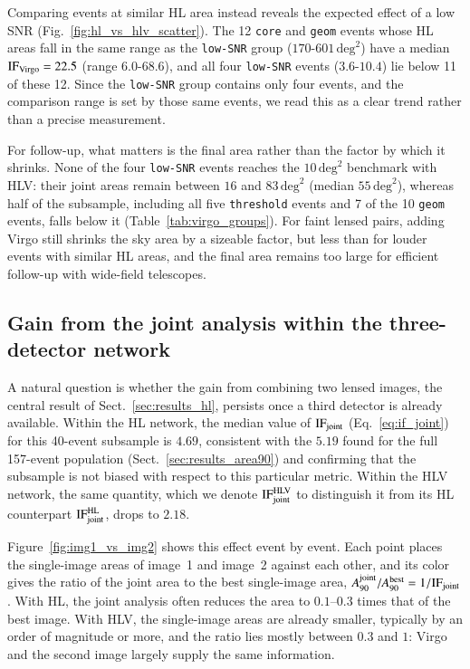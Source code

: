 \documentclass{aa}
\begin{document}
Comparing events at similar HL area instead reveals the expected effect of
a low SNR (Fig.~\ref{fig:hl_vs_hlv_scatter}). The 12 \texttt{core} and
\texttt{geom} events whose HL areas fall in the same range as the
\texttt{low-SNR} group ($170$-$601\,\mathrm{deg}^2$) have a median
$\mathrm{IF}_{\rm Virgo} = 22.5$ (range $6.0$-$68.6$), and all four
\texttt{low-SNR} events ($3.6$-$10.4$) lie below 11 of these 12. Since the
\texttt{low-SNR} group contains only four events, and the comparison range is set by those same events, we read this as a clear trend rather than a precise measurement.

For follow-up, what matters is the final area rather than the factor by which it shrinks. None of the four \texttt{low-SNR} events reaches the $10\,\mathrm{deg}^2$ benchmark with HLV: their joint areas remain between $16$ and $83\,\mathrm{deg}^2$ (median $55\,\mathrm{deg}^2$), whereas half of the subsample, including all five \texttt{threshold} events and 7 of the 10 \texttt{geom} events, falls below it (Table~\ref{tab:virgo_groups}). For faint lensed pairs, adding Virgo still shrinks the sky area by a sizeable
factor, but less than for louder events with similar HL areas, and the final area remains too large for efficient follow-up with wide-field telescopes.

\subsection{Gain from the joint analysis within the three-detector network}
\label{sec:virgo_diminishing}

A natural question is whether the gain from combining two lensed images,
the central result of Sect.~\ref{sec:results_hl}, persists once a third
detector is already available. Within the HL network, the median value of
$\mathrm{IF}_{\rm joint}$ (Eq.~\eqref{eq:if_joint}) for this 40-event
subsample is $4.69$, consistent with the $5.19$ found for the full
157-event population (Sect.~\ref{sec:results_area90}) and confirming that the
subsample is not biased with respect to this particular metric. Within the
HLV network, the same quantity, which we denote $\mathrm{IF}_{\rm joint}^{\rm HLV}$
to distinguish it from its HL counterpart $\mathrm{IF}_{\rm joint}^{\rm HL}$,
drops to $2.18$.

Figure~\ref{fig:img1_vs_img2} shows this effect event by event. Each point
places the single-image areas of image~1 and image~2 against each other,
and its color gives the ratio of the joint area to the best single-image
area, $A_{90}^{\rm joint}/A_{90}^{\rm best} = 1/\mathrm{IF}_{\rm joint}$.
With HL, the joint analysis often reduces the area to $0.1$--$0.3$ times
that of the best image. With HLV, the single-image areas are already
smaller, typically by an order of magnitude or more, and the ratio lies
mostly between $0.3$ and $1$: Virgo and the second image largely supply the
same information.
\end{document}
